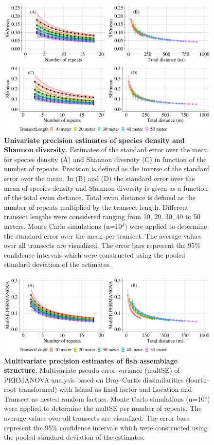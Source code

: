 \documentclass[10pt,letterpaper]{article}
\begin{document}
\begin{figure}[h!]
  \centering\includegraphics[scale=0.65]{precision_SR_and_H_total_dist_N.pdf}
  \caption{{\bf Univariate precision estimates of species density and Shannon diversity}. Estimates of the standard error over the mean for species density (A) and Shannon diversity (C) in function of the number of repeats. Precision is defined as the inverse of the standard error over the mean. In (B) and (D) the standard error over the mean of species density and Shannon diversity is given as a function of the total swim distance. Total swim distance is defined as the number of repeats multiplied by the transect length. Different transect lengths were considered ranging from 10, 20, 30, 40 to 50 meters. Monte Carlo simulations (n=10$^{4}$) were applied to determine the standard error over the mean per transect. The average values over all transects are visualized. The error bars represent the 95\% confidence intervals which were constructed using the pooled standard deviation of the estimates.}
  \label{fig:precision_SR_and_H_total_dist}
\end{figure}

\begin{figure}[h!]
  \centering\includegraphics[scale=0.65]{MSE_permanova_precisionN.pdf}
  \caption{{\bf Multivariate precision estimates of fish assemblage structure}. Multivariate pseudo error variance (multSE) of PERMANOVA analysis based on Bray-Curtis dissimilarities (fourth-root transformed) with Island as fixed factor and Location and Transect as nested random factors. Monte Carlo simulations (n=10$^{4}$) were applied to determine the multSE per number of repeats. The average values over all transects are visualized. The error bars represent the 95\% confidence intervals which were constructed using the pooled standard deviation of the estimates.} 
  \label{fig:MSE_permanova_precision}
\end{figure}
\end{document}
